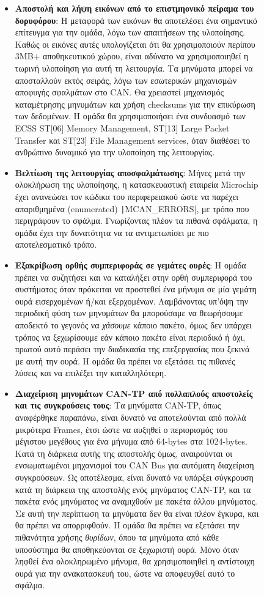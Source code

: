 \documentclass[a4paper,nobib,justified]{tufte-book}
\begin{document}
\begin{figure}
\begin{fullwidth}
	\begin{itemize}
		\item \textbf{Αποστολή και λήψη εικόνων από το επιστμηονικό πείραμα του δορυφόρου}: Η μεταφορά των εικόνων θα αποτελέσει ένα σημαντικό επίτευγμα για την ομάδα, λόγω των απαιτήσεων της υλοποίησης. Καθώς οι εικόνες αυτές υπολογίζεται ότι θα χρησιμοποιούν περίπου 3MB+ αποθηκευτικού χώρου, είναι αδύνατο να χρησιμοποιηθεί η τωρινή υλοποίηση για αυτή τη λειτουργία. Τα μηνύματα μπορεί να αποσταλλούν εκτός σειράς, λόγω των εσωτερικών μηχανισμών αποφυγής σφαλμάτων στο CAN. Θα χρειαστεί μηχανισμός καταμέτρησης μηνυμάτων και χρήση checksums για την επικύρωση των δεδομένων. Η ομάδα θα χρησιμοποιήσει ένα συνδυασμό των ECSS ST[06] Memory Management, ST[13] Large Packet Transfer και ST[23] File Management services, όταν διαθέσει το ανθρώπινο δυναμικό για την υλοποίηση της λειτουργίας.
		\item \textbf{Βελτίωση της λειτουργίας αποσφαλμάτωσης}: Μήνες μετά την ολοκλήρωση της υλοποίησης, η κατασκευαστική εταιρεία Microchip έχει ανανεώσει τον κώδικα του περιφερειακού ώστε να παρέχει απαριθμημένα (enumerated) \texttt|MCAN_ERRORS|, με τρόπο που περιγράφουν το σφάλμα. Γνωρίζοντας πλέον τα πιθανά σφάλματα, η ομάδα έχει την δυνατότητα να τα αντιμετωπίσει με πιο αποτελεσματικό τρόπο.
		\item \textbf{Εξακρίβωση ορθής συμπεριφοράς σε γεμάτες ουρές}: Η ομάδα πρέπει να συζητήσει και να καταλήξει στην ορθή συμπεριφορά του συστήματος όταν πρόκειται να προστεθεί ένα μήνυμα σε μία γεμάτη ουρά εισερχομένων ή/και εξερχομένων. Λαμβάνοντας υπ'όψη την περιοδική φύση των μηνυμάτων θα μπορούσαμε να θεωρήσουμε αποδεκτό το γεγονός να \emph{χάσουμε} κάποιο πακέτο, όμως δεν υπάρχει τρόπος να ξεχωρίσουμε εάν κάποιο πακέτο είναι περιοδικό ή όχι, πρωτού αυτό περάσει την διαδικασία της επεξεργασίας που ξεκινά με αυτή την ουρά. Η ομάδα θα πρέπει να εξετάσει τις πιθανές λύσεις και να επιλέξει την καταλληλότερη. 
		\item \textbf{Διαχείριση μηνυμάτων CAN-TP από πολλαπλούς αποστολείς και τις συγκρούσεις τους}: Τα μηνύματα CAN-TP, όπως αναφέρθηκε παραπάνω, είναι δυνατό να αποτελούνται από πολλά μικρότερα Frames, έτσι ώστε να αυξηθεί ο περιορισμός του μέγιστου μεγέθους για ένα μήνυμα από 64-bytes στα 1024-bytes. Κατά τη διάρκεια αυτής της αποστολής όμως, αναιρούνται οι ενσωματωμένοι μηχανισμοί του CAN Bus για αυτόματη διαχείριση συγκρούσεων. Ως αποτέλεσμα, είναι δυνατό να υπάρξει σύγκρουση κατά τη διάρκεια της αποστολής ενός μηνύματος CAN-TP, και τα πακέτα ενός μηνύματος να αναμιχθούν με πακέτα άλλου μηνύματος. Σε αυτή την περίπτωση τα μηνύματα δεν θα είναι πλέον έγκυρα, και θα πρέπει να απορριφθούν. Η ομάδα θα πρέπει να εξετάσει την πιθανότητα χρήσης \emph{θυρίδων}, όπου τα μηνύματα από κάθε υποσύστημα θα αποθηκεύονται σε ξεχωριστή ουρά. Μόνο όταν ληφθεί ένα ολοκληρωμένο μήνυμα, θα χρησιμοποιηθεί η αντίστοιχη ουρά για την ανακατασκευή του, ώστε να αποφευχθεί αυτό το σφάλμα.

\end{itemize}
\end{fullwidth}
\end{figure}
\end{document}
